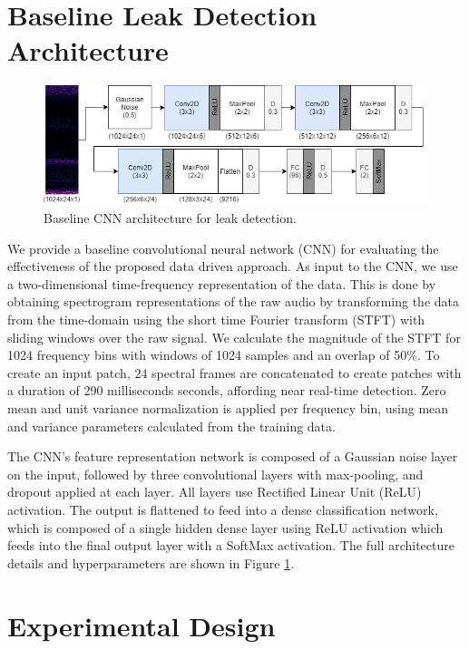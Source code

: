 \section{Baseline Leak Detection Architecture}\label{sec:baseline}

\begin{figure}[t]
	\centering
	\includegraphics[width=0.95\columnwidth]{images/cnn_flow_updated.png}
	\caption{Baseline CNN architecture for leak detection.}
	\label{fig:cnn}
\end{figure}

We provide a baseline convolutional neural network (CNN) for evaluating the effectiveness of the proposed data driven approach. As input to the CNN, we use a two-dimensional time-frequency representation of the data. This is done by obtaining spectrogram representations of the raw audio by transforming the data from the time-domain using the short time Fourier transform (STFT) with sliding windows over the raw signal. We calculate the magnitude of the STFT for 1024 frequency bins with windows of 1024 samples and an overlap of 50\%. To create an input patch, 24 spectral frames are concatenated to create patches with a duration of 290 milliseconds seconds, affording near real-time detection. Zero mean and unit variance normalization is applied per frequency bin, using mean and variance parameters calculated from the training data.

The CNN's feature representation network is composed of a Gaussian noise layer on the input, followed by three convolutional layers with max-pooling, and dropout applied at each layer. All layers use Rectified Linear Unit (ReLU) activation. The output is flattened to feed into a dense classification network, which is composed of a single hidden dense layer using ReLU activation which feeds into the final output layer with a SoftMax activation. The full architecture details and hyperparameters are shown in Figure \ref{fig:cnn}.

\section{Experimental Design}\label{sec:exps}

